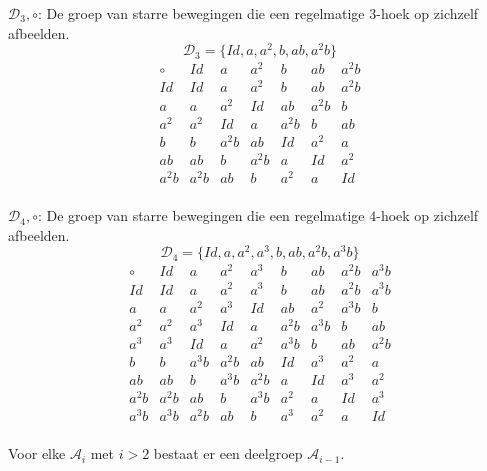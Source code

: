 \documentclass[main.tex]{subfiles}
\begin{document}
\begin{vb}
  $\mathcal{D}_{3},\circ$: De groep van starre bewegingen die een regelmatige $3$-hoek op zichzelf afbeelden.
  \[ \mathcal{D}_{3} = \{ Id, a, a^{2}, b, ab, a^{2}b \} \]
  \[
  \begin{array}{c|cccccc}
    \circ & Id & a & a^{2} & b & ab & a^{2}b\\
    \hline
    Id & Id & a & a^{2} & b & ab & a^{2}b \\
    a & a & a^{2} & Id & ab & a^{2}b & b \\
    a^{2} & a^{2} & Id & a & a^{2}b & b & ab \\
    b & b & a^{2}b & ab & Id & a^{2} & a \\
    ab & ab & b & a^{2}b & a & Id & a^{2} \\
    a^{2}b & a^{2}b & ab & b & a^{2} & a & Id \\
  \end{array}
  \]
\commn \cycln
\end{vb}

\begin{vb}
  $\mathcal{D}_{4},\circ$: De groep van starre bewegingen die een regelmatige $4$-hoek op zichzelf afbeelden.
  \[ \mathcal{D}_{4} = \{ Id, a, a^{2}, a^{3}, b, ab, a^{2}b, a^{3}b \} \]
  \[
  \begin{array}{c|cccccccc}
    \circ & Id & a & a^{2} & a^{3} & b & ab & a^{2}b & a^{3}b \\
    \hline
    Id & Id & a  & a^{2} & a^{3} & b & ab & a^{2}b & a^{3}b \\
    a & a & a^{2} & a^{3} & Id & ab & a^{2} & a^{3}b & b \\
    a^{2} & a^{2} & a^{3} & Id & a & a^{2}b & a^{3}b & b & ab \\
    a^{3} & a^{3} & Id & a & a^{2} & a^{3}b & b & ab & a^{2}b \\
    b & b & a^{3}b & a^{2}b & ab & Id & a^{3} & a^{2} & a \\
    ab & ab & b & a^{3}b & a^{2}b & a & Id & a^{3} & a^{2} \\
    a^{2}b & a^{2}b & ab & b & a^{3}b & a^{2} & a & Id & a^{3} \\
    a^{3}b & a^{3}b & a^{2}b & ab & b & a^{3} & a^{2} & a & Id \\
  \end{array}
  \]
\commn \cycln
\end{vb}

\begin{st}
  Voor elke $\mathcal{A}_{i}$ met $i>2$ bestaat er een deelgroep $\mathcal{A}_{i-1}$.
\end{st}
\end{document}

